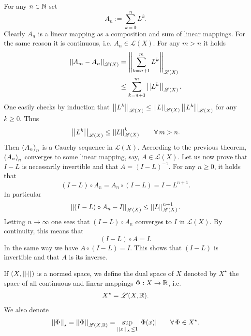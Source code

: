 \documentclass{article}
\begin{document}
\begin{fancyproof}
	For any $n\in\mathbb{N}$ set
	\begin{equation*}
		A_{n}:=\sum_{k=0}^{n}L^{k}.
	\end{equation*}
	Clearly $A_{n}$ is a linear mapping as a composition and sum of linear mappings. For the same reason it is continuous, i.e. $A_{n}\in\mathscr{L}(X)$. For any $m>n$ it holds
	\begin{align*}
		\left|\left|A_{m}-A_{n}\right|\right|_{\mathscr{L}(X)}&=\left|\left|\sum_{k=n+1}^{m}L^{k}\right|\right|_{\mathscr{L}(X)}\\
		&\leq\sum_{k=n+1}^{m}\left|\left|L^{k}\right|\right|_{\mathscr{L}(X)}.
	\end{align*}
	One easily checks by induction that $\left|\left|L^{k}\right|\right|_{\mathscr{L}(X)}\leq\left|\left|L\right|\right|_{\mathscr{L}(X)}\left|\left|L^{k}\right|\right|_{\mathscr{L}(X)}$ for any $k\geq 0$. Thus
	\begin{equation*}
		\left|\left|L^{k}\right|\right|_{\mathscr{L}(X)}\leq\left|\left|L\right|\right|^{k}_{\mathscr{L}(X)}\qquad\forall\, m>n.
	\end{equation*}
	Then ${\left({A}_{n}\right)}_{n}$ is a Cauchy sequence in $\mathscr{L}(X)$. According to the previous theorem, ${\left({A}_{n}\right)}_{n}$ converges to some linear mapping, say, $A\in\mathscr{L}(X)$. Let us now prove that $I-L$ is necessarily invertible and that $A=(I-L)^{-1}$. For any $n\geq 0$, it holds that
	\begin{equation*}
		(I-L)\circ A_{n}=A_{n}\circ(I-L)=I-L^{n+1}.
	\end{equation*}
	In particular
	\begin{equation*}
		\left|\left|(I-L)\circ A_{n}-I\right|\right|_{\mathscr{L}(X)}\leq\left|\left|L\right|\right|^{n+1}_{\mathscr{L}(X)}.
	\end{equation*}
	Letting $n\to\infty$ one sees that $(I-L)\circ A_{n}$ converges to $I$ in $\mathscr{L}(X)$. By continuity, this means that 
	\begin{equation*}
		(I-L)\circ A=I.
	\end{equation*}
	In the same way we have $A\circ(I-L)=I$. This shows that $(I-L)$ is invertible and that $A$ is its inverse.
\end{fancyproof}
\begin{definition}
	If $\left(X,\left|\left|\cdot\right|\right|\right)$ is a normed space, we define the dual space of $X$ denoted by $X^{\star}$ the space of all continuous and linear mappings $\Phi:X\to\mathbb{R}$, i.e.
	\begin{equation*}
		X^{\star}=\mathscr{L}(X,\mathbb{R}).
	\end{equation*}
	We also denote
	\begin{equation*}
		\left|\left|\Phi\right|\right|_{\star}=\left|\left|\Phi\right|\right|_{\mathscr{L}(X,\mathbb{R})}=\sup_{\left|\left|x\right|\right|_{X}\leq 1}|\Phi(x)|\qquad\forall\,\Phi\in X^{\star}.
	\end{equation*}
\end{definition}
\end{document}
